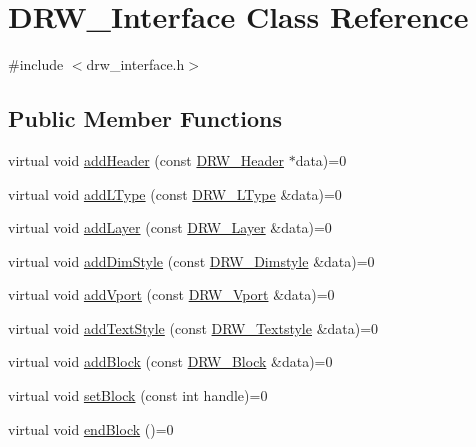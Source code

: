 \hypertarget{class_d_r_w___interface}{}\section{D\+R\+W\+\_\+\+Interface Class Reference}
\label{class_d_r_w___interface}


{\ttfamily \#include $<$drw\+\_\+interface.\+h$>$}

\subsection*{Public Member Functions}
\begin{DoxyCompactItemize}
\item 
virtual void \hyperlink{class_d_r_w___interface_a36ca28f76ddb6df58c683f29fc09e5db}{add\+Header} (const \hyperlink{class_d_r_w___header}{D\+R\+W\+\_\+\+Header} $\ast$data)=0
\item 
virtual void \hyperlink{class_d_r_w___interface_af0b179fdf1f4717b4ecf7570396ab17c}{add\+L\+Type} (const \hyperlink{class_d_r_w___l_type}{D\+R\+W\+\_\+\+L\+Type} \&data)=0
\item 
virtual void \hyperlink{class_d_r_w___interface_a14d5af0530b9d15c70e06695571f15a7}{add\+Layer} (const \hyperlink{class_d_r_w___layer}{D\+R\+W\+\_\+\+Layer} \&data)=0
\item 
virtual void \hyperlink{class_d_r_w___interface_ad9237d153a134b8e41a4e53b8e86dde5}{add\+Dim\+Style} (const \hyperlink{class_d_r_w___dimstyle}{D\+R\+W\+\_\+\+Dimstyle} \&data)=0
\item 
virtual void \hyperlink{class_d_r_w___interface_a62940fa7414131514a4eafcc7bb53af7}{add\+Vport} (const \hyperlink{class_d_r_w___vport}{D\+R\+W\+\_\+\+Vport} \&data)=0
\item 
virtual void \hyperlink{class_d_r_w___interface_a22da4ebff8bc7c1a426a27803a31b677}{add\+Text\+Style} (const \hyperlink{class_d_r_w___textstyle}{D\+R\+W\+\_\+\+Textstyle} \&data)=0
\item 
virtual void \hyperlink{class_d_r_w___interface_ac4e0727bb5223a4974052e20363b6f42}{add\+Block} (const \hyperlink{class_d_r_w___block}{D\+R\+W\+\_\+\+Block} \&data)=0
\item 
virtual void \hyperlink{class_d_r_w___interface_a31ea3946aa9e9042e7dc6d1cb37cf60b}{set\+Block} (const int handle)=0
\item 
virtual void \hyperlink{class_d_r_w___interface_aec16f6683828dbdb703b4b8db640d7a0}{end\+Block} ()=0
\item 

\end{DoxyCompactItemize}
